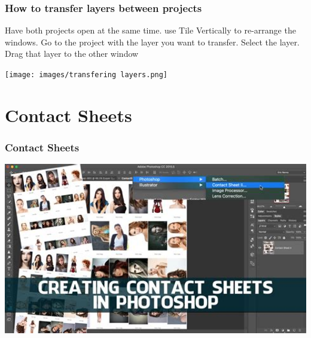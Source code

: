 \documentclass{beamer}
\begin{document}
	\begin{frame}
	\frametitle{How to transfer layers between projects}
	\begin{outline}
		\1 Have both projects open at the same time.
		\1 use Tile Vertically to re-arrange the windows.
		\1 Go to the project with the layer you want to transfer.
		\1 Select the layer.
		\1 Drag that layer to the other window
	\end{outline}
	\begin{center}
		\texttt{[image: images/transfering layers.png]}
	\end{center}
\end{frame}



	\section{Contact Sheets}	
		\begin{frame}
		\frametitle{Contact Sheets}
		\begin{center}
			\includegraphics[width = 1.0\textwidth]{images/contact.jpg}
		\end{center}
	\end{frame}
	
\end{document}
